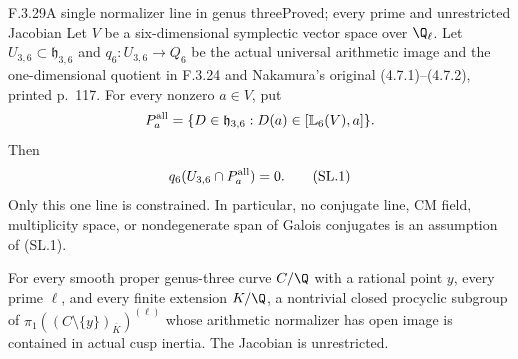 \begin{result}{F.3.29}{A single normalizer line in genus three}{Proved; every prime and unrestricted Jacobian}
Let $V$ be a six-dimensional symplectic vector space over $\Q_\ell$.
Let $U_{3,6}\subset\mathfrak h_{3,6}$ and
$q_6:U_{3,6}\to Q_6$ be the actual universal arithmetic image and
the one-dimensional quotient in F.3.24 and Nakamura's original
(4.7.1)--(4.7.2), printed p.~117.
For every nonzero $a\in V$, put
\[
 P_a^{\rm all}=\{D\in\mathfrak h_{3,6}:
                         D(a)\in[\mathbb L_6(V),a]\}.
\]
Then
\[
                    q_6(U_{3,6}\cap P_a^{\rm all})=0.       \tag{SL.1}
\]
Only this one line is constrained. In particular, no conjugate line,
CM field, multiplicity space, or nondegenerate span of Galois conjugates
is an assumption of (SL.1).

For every smooth proper genus-three curve $C/\Q$ with a rational
point $y$, every prime $\ell$, and every finite extension $K/\Q$,
a nontrivial closed procyclic subgroup of
$\pi_1((C\setminus\{y\})_{\overline K})^{(\ell)}$
whose arithmetic normalizer has open image is contained in actual
cusp inertia. The Jacobian is unrestricted.
\end{result}
